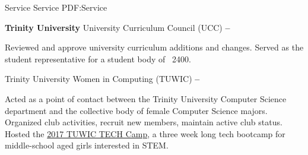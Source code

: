 \Section
{Service}
{Service}
{PDF:Service}

\Entry
\textbf{Trinity University}
\Gap
University Curriculum Council (UCC)
\dotfill
\textbf{ -- }
\begin{Detail}
    \SubBulletItem
    Reviewed and approve university curriculum additions and changes.
    \SubBulletItem
    Served as the student representative for a student body of ~2400.
\end{Detail}

\Gap
Trinity University Women in Computing (TUWIC)
\dotfill
\textbf{ -- }
\begin{Detail}
    \SubBulletItem
    Acted as a point of contact between the Trinity University Computer Science department and the collective body of female Computer Science majors.
    \SubBulletItem
    Organized club activities, recruit new members, maintain active club status.
    \SubBulletItem
    Hosted the \href{http://www.cs.trinity.edu/~tuwic/TECHcamp/}{2017 TUWIC TECH Camp}, a three week long tech bootcamp for middle-school aged girls interested in STEM.
\end{Detail}

